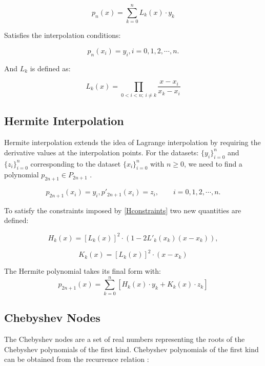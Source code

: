 \documentclass[11pt]{article}%
\begin{document}
\begin{equation}
p_n(x) = \sum_{k=0}^{n} L_k(x)\cdot y_k
\end{equation}

Satisfies the interpolation conditions:

\begin{equation}
p_n(x_i) = y_i, i = 0, 1, 2, \cdots, n.
\end{equation}

And $L_k$ is defined as:

\begin{equation}
L_k(x) = \prod_{0<i<n;\ i \ne k} \frac{x - x_i}{x_k - x_i}
\end{equation}

\subsection{Hermite Interpolation}

Hermite interpolation extends the idea of Lagrange interpolation by requiring the derivative values at the interpolation points. For the datasets: $\{y_i\}^n_{i=0}$ and $\{z_i\}^n_{i=0}$ corresponding to the dataset $\{x_i\}^n_{i=0}$ with $n \geq 0$, we need to find a polynomial $p_{2n+1} \in P_{2n+1}$ \cite{LHK4}.

\begin{equation} \label{Hconstraints}
p_{2n+1}(x_i) = y_i, p'_{2n+1}(x_i) = z_i, \qquad i = 0, 1, 2, \cdots, n.
\end{equation}

To satisfy the constraints imposed by \eqref{Hconstraints} two new quantities are defined:

\begin{equation} \label{Hkeq}
H_{k}(x) = [L_k(x)]^2\cdot (1 - 2L'_k(x_k)(x-x_k)),
\end{equation}

\begin{equation} \label{Kkeq}
K_{k}(x) = [L_k(x)]^2\cdot (x-x_k)
\end{equation}

The Hermite polynomial takes its final form with:
\begin{equation} \label{hermiteEq}
p_{2n+1}(x) = \sum_{k=0}^{n}[H_{k}(x)\cdot y_k + K_{k}(x)\cdot z_k]
\end{equation}

\subsection{Chebyshev Nodes}
The Chebyshev nodes are a set of real numbers representing the roots of the Chebyshev polynomials of the first kind. Chebyshev polynomials of the first kind can be obtained from the recurrence relation \cite{LHK5}:
\end{document}
